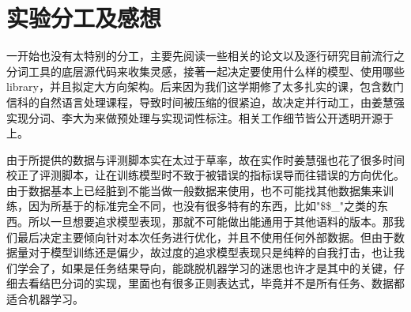 \section{实验分工及感想}
\label{sec:conclusion}

一开始也没有太特别的分工，主要先阅读一些相关的论文以及逐行研究目前流行之分词工具的底层源代码来收集灵感，接著一起决定要使用什么样的模型、使用哪些 library，并且拟定大方向架构。后来因为我们这学期修了太多扎实的课，包含数门信科的自然语言处理课程，导致时间被压缩的很紧迫，故决定并行动工，由姜慧强实现分词、李大为来做预处理与实现词性标注。相关工作细节皆公开透明开源于  上。

由于所提供的数据与评测脚本实在太过于草率，故在实作时姜慧强也花了很多时间校正了评测脚本，让在训练模型时不致于被错误的指标误导而往错误的方向优化。由于数据基本上已经脏到不能当做一般数据来使用，也不可能找其他数据集来训练，因为所基于的标准完全不同，也没有很多特有的东西，比如"\$\$\_"之类的东西。所以一旦想要追求模型表现，那就不可能做出能通用于其他语料的版本。那我们最后决定主要倾向针对本次任务进行优化，并且不使用任何外部数据。但由于数据量对于模型训练还是偏少，故过度的追求模型表现只是纯粹的自我打击，也让我们学会了，如果是任务结果导向，能跳脱机器学习的迷思也许才是其中的关键，仔细去看结巴分词的实现，里面也有很多正则表达式，毕竟并不是所有任务、数据都适合机器学习。
